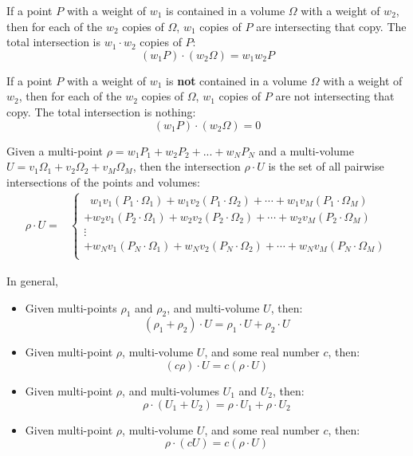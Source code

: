 If a point \(P\) with a weight of \(w_1\) is contained in a volume \(\Omega\) with a weight of \(w_2\), then for each of the \(w_2\) copies of \(\Omega\), \(w_1\) copies of \(P\) are intersecting that copy. The total intersection is \(w_1 \cdot w_2\) copies of \(P\):
\[(w_1 P) \cdot (w_2\Omega) = w_1w_2P\]      

If a point \(P\) with a weight of \(w_1\) is {\bf not} contained in a volume \(\Omega\) with a weight of \(w_2\), then for each of the \(w_2\) copies of \(\Omega\), \(w_1\) copies of \(P\) are not intersecting that copy. The total intersection is nothing:
\[(w_1 P) \cdot (w_2\Omega) = 0\]      

Given a multi-point \(\rho = w_1 P_1 + w_2 P_2 + ... + w_N P_N\) and a multi-volume \\ \(U = v_1\Omega_1 + v_2\Omega_2 + v_M\Omega_M\), then the intersection \(\rho \cdot U\) is the set of all pairwise intersections of the points and volumes:
\begin{align*}
\rho \cdot U = & \left\{\begin{array}{c}
\;\; w_1 v_1 (P_1 \cdot \Omega_1) + w_1 v_2 (P_1 \cdot \Omega_2) + \cdots + w_1 v_M (P_1 \cdot \Omega_M) \\ 
+ w_2 v_1 (P_2 \cdot \Omega_1) + w_2 v_2 (P_2 \cdot \Omega_2) + \cdots + w_2 v_M (P_2 \cdot \Omega_M) \\ 
\vdots \\
+ w_N v_1 (P_N \cdot \Omega_1) + w_N v_2 (P_N \cdot \Omega_2) + \cdots + w_N v_M (P_N \cdot \Omega_M) \\ 
\end{array}\right.
\end{align*}

In general,
\begin{itemize}
\item Given multi-points \(\rho_1\) and \(\rho_2\), and multi-volume \(U\), then:
\[(\rho_1 + \rho_2) \cdot U = \rho_1 \cdot U + \rho_2 \cdot U\] 
\item Given multi-point \(\rho\), multi-volume \(U\), and some real number \(c\), then:
\[(c\rho) \cdot U = c(\rho \cdot U)\]
\item Given multi-point \(\rho\), and multi-volumes \(U_1\) and \(U_2\), then:
\[\rho \cdot (U_1 + U_2) = \rho \cdot U_1 + \rho \cdot U_2\] 
\item Given multi-point \(\rho\), multi-volume \(U\), and some real number \(c\), then:
\[\rho \cdot (cU) = c(\rho \cdot U)\]
\end{itemize}

